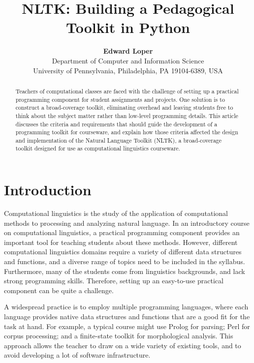 \documentclass{article}
\begin{document}
\title{NLTK: Building a Pedagogical Toolkit in Python}
\author{\textbf{Edward Loper}\\
Department of Computer and Information Science\\
University of Pennsylvania, Philadelphia, PA 19104-6389, USA}
\date{}
\maketitle

\begin{abstract}
  
  Teachers of computational classes are faced with the challenge of
  setting up a practical programming component for student assignments
  and projects.  One solution is to construct a broad-coverage
  toolkit, eliminating overhead and leaving students free to think
  about the subject matter rather than low-level programming details.
  This article discusses the criteria and requirements that should
  guide the development of a programming toolkit for courseware, and
  explain how those criteria affected the design and implementation of
  the Natural Language Toolkit (NLTK), a broad-coverage toolkit
  designed for use as computational linguistics courseware.
  
\end{abstract}

\section{Introduction}

Computational linguistics is the study of the application of
computational methods to processing and analyzing natural language.
In an introductory course on computational linguistics, a practical
programming component provides an important tool for teaching students
about these methods.  However, different computational linguistics
domains require a variety of different data structures and functions,
and a diverse range of topics need to be included in the syllabus.
Furthermore, many of the students come from linguistics backgrounds,
and lack strong programming skills.  Therefore, setting up an
easy-to-use practical component can be quite a challenge.

A widespread practice is to employ multiple programming languages,
where each language provides native data structures and functions that
are a good fit for the task at hand.  For example, a typical course
might use Prolog for parsing; Perl for corpus processing; and a
finite-state toolkit for morphological analysis.  This approach allows
the teacher to draw on a wide variety of existing tools, and to avoid
developing a lot of software infrastructure.
\end{document}
